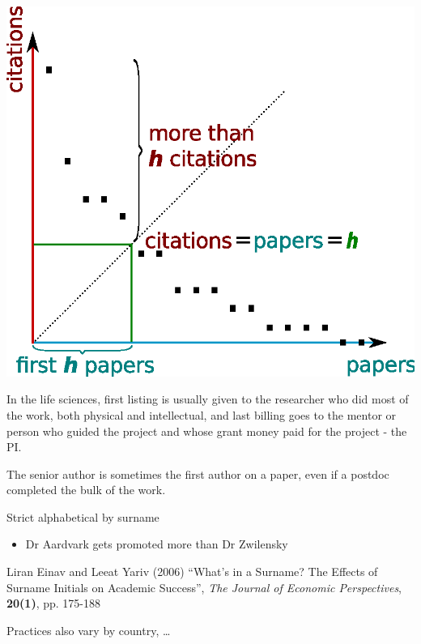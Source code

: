 \documentclass[a4paper,landscape,headrule,footrule,xetex]{foils}
\begin{document}
\begin{center}
\includegraphics[height=0.9\textheight]{../pics/H-index-en.eps}  
\end{center}




\begin{description}\addtolength{\itemsep}{-1ex} 
\item[Natural Sciences] In the life sciences, first listing is usually
  given to the researcher who did most of the work, both physical and
  intellectual, and last billing goes to the mentor or person who
  guided the project and whose grant money paid for the project - the
  PI.
\item[Chemistry] The senior author is sometimes the first author on a
  paper, even if a postdoc completed the bulk of the work.
\item[Archeology, Economics] Strict alphabetical by surname
  \begin{itemize}
  \item Dr Aardvark gets promoted more than Dr Zwilensky
  \end{itemize}
 Liran Einav and Leeat Yariv (2006) ``What's in a Surname? The Effects of Surname Initials on Academic Success'',  
  \textit{The Journal of Economic Perspectives}, \textbf{20(1)}, pp. 175-188
\item Practices also vary by country, \ldots
\end{description}
\end{document}
